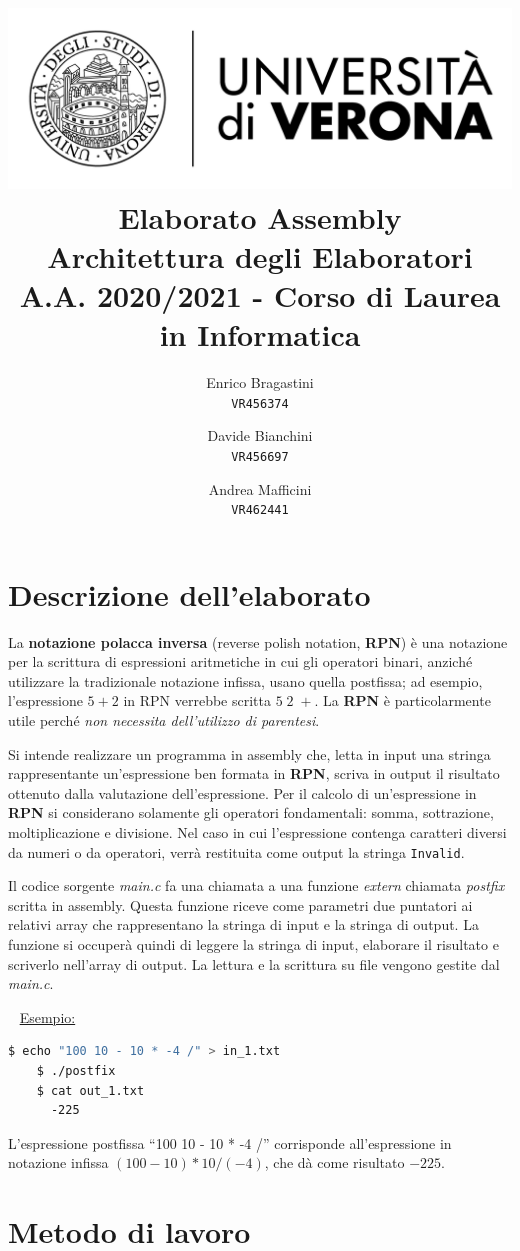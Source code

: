 \documentclass[a4paper,11pt,oneside]{book}
\title{
    {\includegraphics{logo-univr.png}} \\
    \LARGE{\textbf{Elaborato Assembly}} \\
    Architettura degli Elaboratori      \\
    A.A. 2020/2021 - Corso di Laurea in Informatica
}
\author{
  Enrico Bragastini\\
  \texttt{VR456374}
  \and
  Davide Bianchini \\
  \texttt{VR456697}
  \and
  Andrea Mafficini \\
  \texttt{VR462441}
}
\date{}
\begin{document}
\pagestyle{fancy}
\fancyhf{}
\rhead{}
\lhead{\nouppercase\leftmark}
\cfoot{\thepage}
\frontmatter

\maketitle
\tableofcontents

\mainmatter
\chapter{Descrizione dell'elaborato}
La \textbf{notazione polacca inversa} (reverse polish notation, \textbf{RPN}) è una notazione per la scrittura di espressioni aritmetiche in cui gli operatori binari, 
anziché utilizzare la tradizionale notazione infissa, usano quella postfissa; ad esempio, l’espressione $5 + 2$ in RPN verrebbe scritta $5 \; 2 \; +$. La \textbf{RPN} è 
particolarmente utile perché \emph{non necessita dell’utilizzo di parentesi}. 

Si intende realizzare un programma in assembly che, letta in input una stringa rappresentante un’espressione ben formata in \textbf{RPN}, scriva in output il risultato ottenuto dalla valutazione dell’espressione.
Per il calcolo di un'espressione in \textbf{RPN} si considerano solamente gli operatori fondamentali: somma, sottrazione, moltiplicazione e divisione.
Nel caso in cui l'espressione contenga caratteri diversi da numeri o da operatori, verrà restituita come output la stringa \verb|Invalid|.

Il codice sorgente \emph{main.c} fa una chiamata a una funzione \emph{extern} chiamata \emph{postfix} scritta in assembly. Questa funzione riceve come parametri due puntatori ai relativi array
che rappresentano la stringa di input e la stringa di output. La funzione si occuperà quindi di leggere la stringa di input, elaborare il risultato e scriverlo nell'array di output.
La lettura e la scrittura su file vengono gestite dal \emph{main.c}.

~\newline
\underline{Esempio:}
\begin{lstlisting}[language=Bash, showstringspaces=false]
    $ echo "100 10 - 10 * -4 /" > in_1.txt
    $ ./postfix
    $ cat out_1.txt 
      -225
\end{lstlisting}
L'espressione postfissa ``100 10 - 10 * -4 /'' corrisponde all'espressione in notazione infissa $(100-10) * 10 / (-4)$, che dà come risultato $-225$.


\chapter{Metodo di lavoro}
\end{document}
